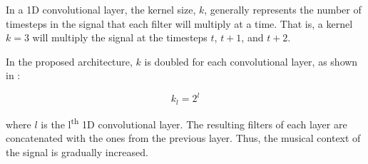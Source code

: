 
In a 1D convolutional layer, the kernel size, $k$, generally
represents the number of timesteps in the signal that each
filter will multiply at a time. That is, a kernel $k=3$ will
multiply the signal at the timesteps $t$, $t+1$, and $t+2$.

In the proposed architecture, $k$ is doubled for each
convolutional layer, as shown in :

\begin{equation}
    \label{eq:kernel_size}
    k_l = 2^{l}
\end{equation}

where $l$ is the l\textsuperscript{th} 1D convolutional
layer. The resulting filters of each layer are concatenated
with the ones from the previous layer. Thus, the musical
context of the signal is gradually increased.
